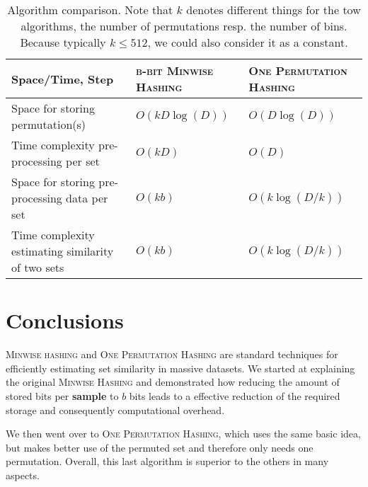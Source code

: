 \documentclass[a4paper]{article}
\begin{document}
\begin{table}[h]
{
\begin{tabulary}{1\textwidth}{LLL}
\hline \textbf{Space/Time, Step} 
& \textsc{b-bit Minwise Hashing} & \textsc{One Permutation Hashing} \\ 
\hline Space for storing permutation(s) & $O(kD\log(D))$ & $O(D\log(D))$ \\ 
\hline Time complexity pre-processing per set & $O(kD)$ & $O(D)$ \\ 
\hline Space for storing pre-processing data per set & $O(kb)$ & $O(k \log(D/k))$ \\ 
\hline Time complexity estimating similarity of two sets & $O(kb)$ & $O(k \log(D/k))$ \\ 
\hline
\end{tabulary}
}
\caption{Algorithm comparison. Note that $k$ denotes different things for the tow algorithms, the number of permutations resp. the number of bins. Because typically $k \leq 512$, we could also consider it as a constant.}
\label{table:comparison}
\end{table}


\section{Conclusions}

\textsc{Minwise hashing} and \textsc{One Permutation Hashing} are standard techniques for efficiently estimating set similarity in massive datasets. We started at explaining the original \textsc{Minwise Hashing} and demonstrated how reducing the amount of stored bits per \textbf{sample} to $b$ bits leads to a effective reduction of the required storage and consequently computational overhead.

We then went over to \textsc{One Permutation Hashing}, which uses the same basic idea, but makes better use of the permuted set and therefore only needs one permutation. Overall, this last algorithm is superior to the others in many aspects.



\end{document}
